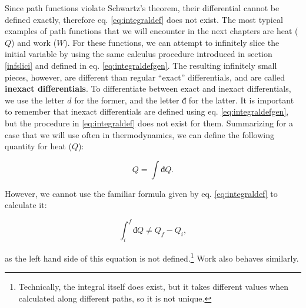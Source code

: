 \documentclass[
  9pt,
]{extbook}
\theoremstyle{definition}
\theoremstyle{definition}
\theoremstyle{definition}
\theoremstyle{definition}
\theoremstyle{remark}
\begin{document}
Since path functions violate Schwartz's theorem, their differential cannot be defined exactly, therefore eq. \eqref{eq:integraldef} does not exist. The most typical examples of path functions that we will encounter in the next chapters are heat (\(Q\)) and work (\(W\)). For these functions, we can attempt to infinitely slice the initial variable by using the same calculus procedure introduced in section \ref{infslici} and defined in eq. \eqref{eq:integraldefgen}. The resulting infinitely small pieces, however, are different than regular ``exact'' differentials, and are called \textbf{inexact differentials}. To differentiate between exact and inexact differentials, we use the letter \(d\) for the former, and the letter \(đ\) for the latter. It is important to remember that inexact differentials are defined using eq. \eqref{eq:integraldefgen}, but the procedure in \eqref{eq:integraldef} does not exist for them. Summarizing for a case that we will use often in thermodynamics, we can define the following quantity for heat (\(Q\)):

\begin{equation}
  Q = \int đQ.   
  \label{eq:intdbarQ}
\end{equation}

However, we cannot use the familiar formula given by eq. \eqref{eq:integraldef} to calculate it:

\begin{equation}
  \int_{i}^{f} đQ \neq Q_f - Q_i,     
  \label{eq:intdbarQfull}
\end{equation}

as the left hand side of this equation is not defined.\footnote{Technically, the integral itself does exist, but it takes different values when calculated along different paths, so it is not unique.} Work also behaves similarly.
\end{document}
